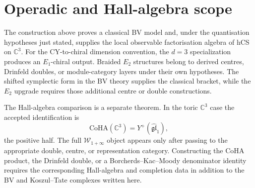 \documentclass[11pt]{amsart}
\providecommand{\C}{\mathbb{C}}
\providecommand{\CoHA}{\mathrm{CoHA}}
\theoremstyle{plain}
\theoremstyle{definition}
\begin{document}
\section{Operadic and Hall-algebra scope}

The construction above proves a classical BV model and, under the
quantisation hypotheses just stated, supplies the local observable
factorisation algebra of hCS on \(\C^3\). For the CY-to-chiral
dimension convention, the \(d=3\) specialization produces an
\(E_1\)-chiral output. Braided \(E_2\) structures belong to derived
centres, Drinfeld doubles, or module-category layers under their own
hypotheses. The shifted symplectic form in the BV theory supplies the
classical bracket, while the \(E_2\) upgrade requires those additional
centre or double constructions.

The Hall-algebra comparison is a separate theorem. In the toric
\(\C^3\) case the accepted identification is
\[
  \CoHA(\C^3)=Y^+(\widehat{\mathfrak{gl}}_1),
\]
the positive half. The full \(\mathcal W_{1+\infty}\) object appears
only after passing to the appropriate double, centre, or representation
category. Constructing the CoHA product, the Drinfeld double, or a
Borcherds--Kac--Moody denominator identity requires the corresponding
Hall-algebra and completion data in addition to the BV and
Koszul--Tate complexes written here.
\end{document}
